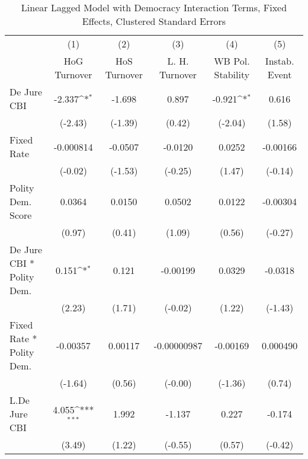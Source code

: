 {
\def\sym#1{\ifmmode^{#1}\else\(^{#1}\)\fi}
\begin{longtable}{l*{5}{c}}
\caption{Linear Lagged Model with Democracy Interaction Terms, Fixed Effects, Clustered Standard Errors \label{demintlagsDJ}}\\
\hline\hline\endfirsthead\hline\endhead\hline\endfoot\endlastfoot
                &\multicolumn{1}{c}{(1)}&\multicolumn{1}{c}{(2)}&\multicolumn{1}{c}{(3)}&\multicolumn{1}{c}{(4)}&\multicolumn{1}{c}{(5)}\\
                &\multicolumn{1}{c}{HoG Turnover}&\multicolumn{1}{c}{HoS Turnover}&\multicolumn{1}{c}{L. H. Turnover}&\multicolumn{1}{c}{WB Pol. Stability}&\multicolumn{1}{c}{Instab. Event}\\
\hline
De Jure CBI     &   -2.337\sym{*}  &   -1.698         &    0.897         &   -0.921\sym{*}  &    0.616         \\
                &  (-2.43)         &  (-1.39)         &   (0.42)         &  (-2.04)         &   (1.58)         \\
[1em]
Fixed Rate      &-0.000814         &  -0.0507         &  -0.0120         &   0.0252         & -0.00166         \\
                &  (-0.02)         &  (-1.53)         &  (-0.25)         &   (1.47)         &  (-0.14)         \\
[1em]
Polity Dem. Score&   0.0364         &   0.0150         &   0.0502         &   0.0122         & -0.00304         \\
                &   (0.97)         &   (0.41)         &   (1.09)         &   (0.56)         &  (-0.27)         \\
[1em]
De Jure CBI * Polity Dem.&    0.151\sym{*}  &    0.121         & -0.00199         &   0.0329         &  -0.0318         \\
                &   (2.23)         &   (1.71)         &  (-0.02)         &   (1.22)         &  (-1.43)         \\
[1em]
Fixed Rate * Polity Dem.& -0.00357         &  0.00117         &-0.00000987         & -0.00169         & 0.000490         \\
                &  (-1.64)         &   (0.56)         &  (-0.00)         &  (-1.36)         &   (0.74)         \\
[1em]
L.De Jure CBI   &    4.055\sym{***}&    1.992         &   -1.137         &    0.227         &   -0.174         \\
                &   (3.49)         &   (1.22)         &  (-0.55)         &   (0.57)         &  (-0.42)         \\

\end{longtable}}
